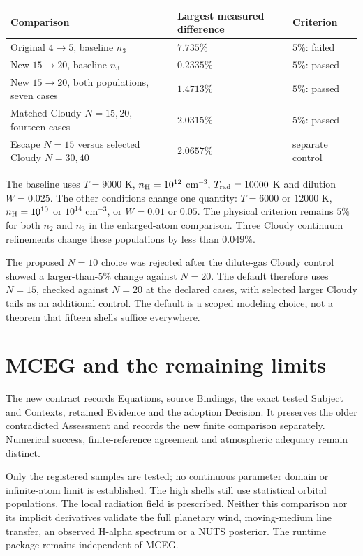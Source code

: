 \documentclass[10pt,a4paper]{article}
\begin{document}
\begin{center}
\begin{tabular}{lll}
\toprule
Comparison & Largest measured difference & Criterion \\
\midrule
Original $4\to5$, baseline $n_3$ & $7.735\%$ & $5\%$: failed \\
New $15\to20$, baseline $n_3$ & $0.2335\%$ & $5\%$: passed \\
New $15\to20$, both populations, seven cases & $1.4713\%$ & $5\%$: passed \\
Matched Cloudy $N=15,20$, fourteen cases & $2.0315\%$ & $5\%$: passed \\
Escape $N=15$ versus selected Cloudy $N=30,40$ & $2.0657\%$ & separate control \\
\bottomrule
\end{tabular}
\end{center}

The baseline uses $T=9000$ K, $n_{\rm H}=10^{12}$ cm$^{-3}$,
$T_{\rm rad}=10000$ K and dilution $W=0.025$. The other conditions change
one quantity: $T=6000$ or $12000$ K, $n_{\rm H}=10^{10}$ or $10^{14}$ cm$^{-3}$,
or $W=0.01$ or $0.05$. The physical criterion remains $5\%$ for both $n_2$ and
$n_3$ in the enlarged-atom comparison. Three Cloudy continuum refinements change
these populations by less than $0.049\%$.


The proposed $N=10$ choice was rejected after the dilute-gas Cloudy control
showed a larger-than-$5\%$ change against $N=20$. The default therefore uses
$N=15$, checked against $N=20$ at the declared cases, with selected larger
Cloudy tails as an additional control. The default is a scoped modeling
choice, not a theorem that fifteen shells suffice everywhere.

\section{MCEG and the remaining limits}
The new contract  records
Equations, source Bindings, the exact tested Subject and Contexts, retained
Evidence and the adoption Decision. It preserves the older contradicted
Assessment and records the new finite comparison separately. Numerical
success, finite-reference agreement and atmospheric adequacy remain distinct.

Only the registered samples are tested; no continuous parameter domain or
infinite-atom limit is established. The high shells still use statistical
orbital populations. The local radiation field is prescribed. Neither this
comparison nor its implicit derivatives validate the full planetary wind,
moving-medium line transfer, an observed H-alpha spectrum or a NUTS posterior.
The runtime package remains independent of MCEG.
\end{document}
